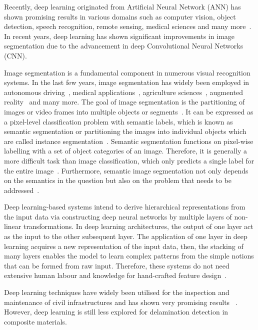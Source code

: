 Recently, deep learning originated from Artificial Neural Network (ANN) has shown promising results in various domains such as computer vision, object detection, speech recognition, remote sensing, medical sciences and many more~\cite{deng2014deep, mohanty2016using, zhang2020well, pashaei2020review}. 
In recent years, deep learning has shown significant improvements in image segmentation due to the advancement in deep Convolutional Neural Networks (CNN). 

Image segmentation is a fundamental component in numerous visual recognition systems. 
In the last few years, image segmentation has widely been employed in autonomous driving~\cite{zhang2013understanding, cordts2016cityscapes, ros2016synthia, li2018real}, medical applications~\cite{taghanaki2020deep}, agriculture sciences~\cite{milioto2018real}, augmented reality~\cite{miksik2015semantic} and many more. 
The goal of image segmentation is the partitioning of images or video frames into multiple objects or segments~\cite{szeliski2010computer}. 
It can be expressed as a pixel-level classification problem with semantic labels, which is known as semantic segmentation or partitioning the images into individual objects which are called instance segmentation~\cite{minaee2020image}. 
Semantic segmentation functions on pixel-wise labelling with a set of object categories of an image.  
Therefore, it is generally a more difficult task than image classification, which only predicts a single label for the entire image~\cite{minaee2020image}. 
Furthermore, semantic image segmentation not only depends on the semantics in the question but also on the problem that needs to be addressed~\cite{ghosh2019understanding}.

Deep learning-based systems intend to derive hierarchical representations from the input data via constructing deep neural networks by multiple layers of non-linear transformations. 
In deep learning architectures, the output of one layer act as the input to the other subsequent layer. 
The application of one layer in deep learning acquires a new representation of the input data, then, the stacking of many layers enables the model to learn complex patterns from the simple notions that can be formed from raw input. 
Therefore, these systems do not need extensive human labour and knowledge for hand-crafted feature design~\cite{zhao2019deep, yuan2020machine}.

Deep learning techniques have widely been utilised for the inspection and maintenance of civil infrastructures and has shown very promising results ~\cite{cha2017deep, lin2017structural, liu2019computer}. 
However, deep learning is still less explored for delamination detection in composite materials.   

